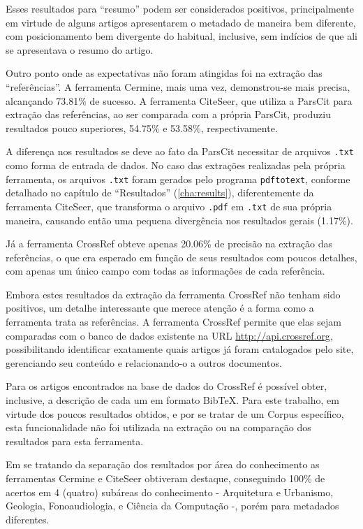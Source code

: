 Esses resultados para ``resumo'' podem ser considerados positivos, principalmente em virtude de alguns artigos apresentarem o metadado de maneira bem diferente, com posicionamento bem divergente do habitual, inclusive, sem indícios de que ali se apresentava o resumo do artigo.

Outro ponto onde as expectativas não foram atingidas foi na extração das ``referências''. A ferramenta Cermine, mais uma vez, demonstrou-se mais precisa, alcançando 73.81\% de sucesso. A ferramenta CiteSeer, que utiliza a ParsCit para extração das referências, ao ser comparada com a própria ParsCit, produziu resultados pouco superiores, 54.75\% e 53.58\%, respectivamente. 

A diferença nos resultados se deve ao fato da ParsCit necessitar de arquivos \texttt{.txt} como forma de entrada de dados. No caso das extrações realizadas pela própria ferramenta, os arquivos \texttt{.txt} foram gerados pelo programa \texttt{pdftotext}, conforme detalhado no capítulo de ``Resultados'' (\autoref{cha:results}), diferentemente da ferramenta CiteSeer, que transforma o arquivo \texttt{.pdf} em \texttt{.txt} de sua própria maneira, causando então uma pequena divergência nos resultados gerais (1.17\%). 

Já a ferramenta CrossRef obteve apenas 20.06\% de precisão na extração das referências, o que era esperado em função de seus resultados com poucos detalhes, com apenas um único campo com todas as informações de cada referência.

Embora estes resultados da extração da ferramenta CrossRef não tenham sido positivos, um detalhe interessante que merece atenção é a forma como a ferramenta trata as referências. A ferramenta CrossRef permite que elas sejam comparadas com o banco de dados existente na URL \url{http://api.crossref.org}, possibilitando identificar exatamente quais artigos já foram catalogados pelo site, gerenciando seu conteúdo e relacionando-o a outros documentos. 

Para os artigos encontrados na base de dados do CrossRef é possível obter, inclusive, a descrição de cada um em formato BibTeX. Para este trabalho, em virtude dos poucos resultados obtidos, e por se tratar de um Corpus específico, esta funcionalidade não foi utilizada na extração ou na comparação dos resultados para esta ferramenta.

Em se tratando da separação dos resultados por área do conhecimento as ferramentas Cermine e CiteSeer obtiveram destaque, conseguindo 100\% de acertos em 4 (quatro) subáreas do conhecimento - Arquitetura e Urbanismo, Geologia, Fonoaudiologia, e Ciência da Computação -, porém para metadados diferentes.

